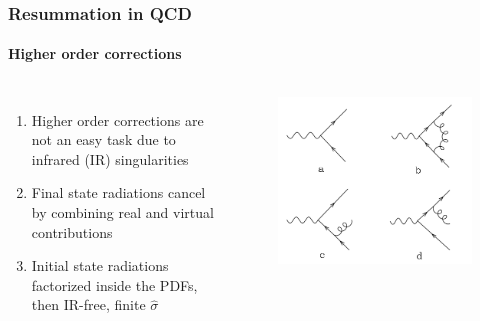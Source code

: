 \documentclass[aspectratio=43]{beamer}
\begin{document}
\begin{frame}

	\frametitle{Resummation in QCD}
	\framesubtitle{Higher order corrections}
	\begin{columns}
	
	
	\begin{enumerate}
		\item Higher order corrections are {\color{red}not an easy task} due to {\color{red} infrared (IR) singularities}
		\item Final state radiations cancel by combining real and virtual contributions
		\item Initial state radiations factorized inside the PDFs, then {\color{blue} IR-free, finite $\hat{\sigma}$}
	\end{enumerate}
	
	\begin{figure}[!htb]
		\includegraphics[width = \linewidth]{plots/qcd_corrections.png}
	\end{figure}
	
	\end{columns}

\end{frame}
\end{document}
